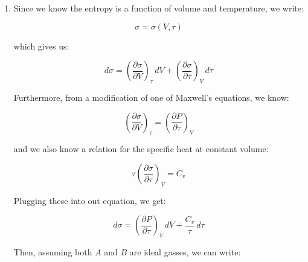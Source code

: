 \begin{enumerate}

    \setcounter{enumi}{5}

  \item

    Since we know the entropy is a function of volume and temperature, we write:

    $$\sigma=\sigma(V,\tau)$$

    which gives us:

    $$d\sigma=\left( \frac{\partial \sigma}{\partial V} \right)_\tau\,dV+\left( \frac{\partial \sigma}{\partial \tau} \right)_V\,d\tau$$

    Furthermore, from a modification of one of Maxwell's equations, we know:

    $$\left( \frac{\partial \sigma}{\partial V} \right)_\tau=\left( \frac{\partial P}{\partial \tau} \right)_V$$

    and we also know a relation for the specific heat at constant volume:

    $$\tau\left( \frac{\partial \sigma}{\partial \tau} \right)_V=C_v$$

    Plugging these into out equation, we get:

    $$d\sigma=\left( \frac{\partial P}{\partial\tau} \right)_V\,dV+\frac{C_v}{\tau}\,d\tau$$

    Then, assuming both $A$ and $B$ are ideal gasses, we can write:


\end{enumerate}
